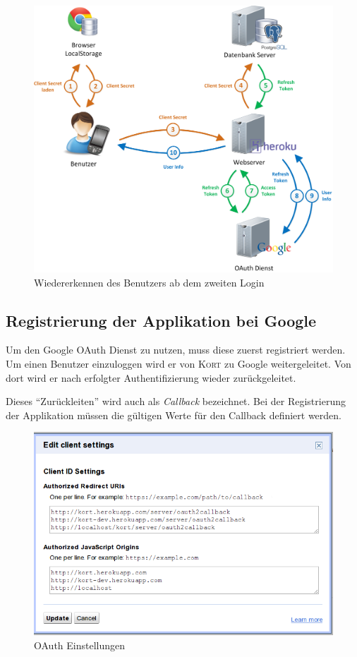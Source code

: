 \begin{figure}[H]
	\centering
	\includegraphics[width=\textwidth]{images/implementation/backend/kort-relogin}
	\caption{Wiedererkennen des Benutzers ab dem zweiten Login}
	\label{image-kort-relogin}
\end{figure}

\subsection{Registrierung der Applikation bei Google}
Um den Google \gls{OAuth} Dienst zu nutzen, muss diese zuerst registriert werden.
Um einen Benutzer einzuloggen wird er von \textsc{Kort} zu Google weitergeleitet.
Von dort wird er nach erfolgter Authentifizierung wieder zurückgeleitet.

Dieses "`Zurückleiten"' wird auch als \emph{Callback} bezeichnet.
Bei der Registrierung der Applikation müssen die gültigen Werte für den Callback definiert werden.

\begin{figure}[H]
	\centering
	\includegraphics[scale=0.5]{images/implementation/backend/oauth-google-settings}
	\caption{OAuth Einstellungen}
\end{figure}